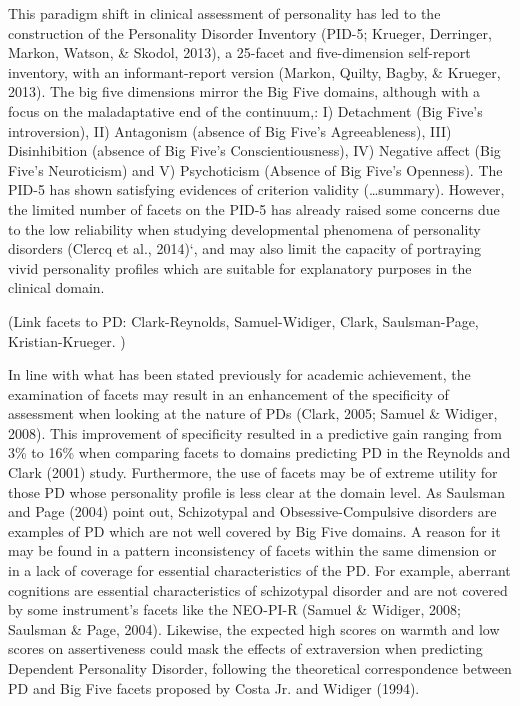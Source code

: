 \documentclass[man]{apa6}
\theoremstyle{definition}
\theoremstyle{definition}
\theoremstyle{definition}
\theoremstyle{remark}
\begin{document}
This paradigm shift in clinical assessment of personality has led to the
construction of the Personality Disorder Inventory (PID-5; Krueger,
Derringer, Markon, Watson, \& Skodol, 2013), a 25-facet and
five-dimension self-report inventory, with an informant-report version
(Markon, Quilty, Bagby, \& Krueger, 2013). The big five dimensions
mirror the Big Five domains, although with a focus on the maladaptative
end of the continuum,: I) Detachment (Big Five's introversion), II)
Antagonism (absence of Big Five's Agreeableness), III) Disinhibition
(absence of Big Five's Conscientiousness), IV) Negative affect (Big
Five's Neuroticism) and V) Psychoticism (Absence of Big Five's
Openness). The PID-5 has shown satisfying evidences of criterion
validity (\ldots{}summary). However, the limited number of facets on the
PID-5 has already raised some concerns due to the low reliability when
studying developmental phenomena of personality disorders (Clercq et
al., 2014)`, and may also limit the capacity of portraying vivid
personality profiles which are suitable for explanatory purposes in the
clinical domain.

(Link facets to PD: Clark-Reynolds, Samuel-Widiger, Clark,
Saulsman-Page, Kristian-Krueger. )

In line with what has been stated previously for academic achievement,
the examination of facets may result in an enhancement of the
specificity of assessment when looking at the nature of PDs (Clark,
2005; Samuel \& Widiger, 2008). This improvement of specificity resulted
in a predictive gain ranging from 3\% to 16\% when comparing facets to
domains predicting PD in the Reynolds and Clark (2001) study.
Furthermore, the use of facets may be of extreme utility for those PD
whose personality profile is less clear at the domain level. As Saulsman
and Page (2004) point out, Schizotypal and Obsessive-Compulsive
disorders are examples of PD which are not well covered by Big Five
domains. A reason for it may be found in a pattern inconsistency of
facets within the same dimension or in a lack of coverage for essential
characteristics of the PD. For example, aberrant cognitions are
essential characteristics of schizotypal disorder and are not covered by
some instrument's facets like the NEO-PI-R (Samuel \& Widiger, 2008;
Saulsman \& Page, 2004). Likewise, the expected high scores on warmth
and low scores on assertiveness could mask the effects of extraversion
when predicting Dependent Personality Disorder, following the
theoretical correspondence between PD and Big Five facets proposed by
Costa Jr. and Widiger (1994).
\end{document}
